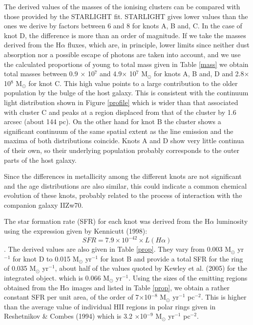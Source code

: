\documentclass[structabstract]{aa}
\begin{document}
The derived values of the masses of the ionising clusters can be compared with those provided by the
STARLIGHT fit. STARLIGHT gives lower values than the ones we derive by factors between 6 and 8 for knots A, B and, C. 
In the case of knot D, the difference is more than an order of magnitude. If we 
take the masses derived from the H$\alpha$ fluxes, which are, in principle, lower limits since neither dust absorption nor a possible escape of photons are taken into account, and we use the calculated proportions of young to total mass given in Table \ref{mass} we obtain total masses between 0.9 $\times$ 10$^7$ and 4.9$\times$ 10$^7$ M$_{\odot}$ for knots A, B and, D and 2.8$\times$10$^8$ M$_{\odot}$ for knot  C. This high value points to a large contribution to the older population by the bulge of the host galaxy. This is consistent with the continuum light distribution shown in Figure \ref{profile} which is wider than that associated with cluster C and peaks at a region displaced from that of the cluster by 1.6 arcsec (about 144 pc). On the other hand for knot B the cluster shows a significant continuum of the same spatial extent as the line emission and the maxima of both distributions coincide. Knots A and D show very little continua of their own, so their underlying population probably corresponds to the outer parts of the host galaxy.

Since the differences in metallicity among the different knots are not significant and the age distributions are also similar, this could indicate a common chemical evolution of these knots, probably related to the process of interaction with the companion galaxy IIZw70. 

The star formation rate (SFR) for each knot was derived from the H$\alpha$ luminosity using the expression given by Kennicutt (1998): 
\[ SFR = 7.9 \times 10^{-42} \times L(H\alpha) \].
The derived values are also given in Table \ref{prop}. They vary from 0.003 M$_\odot$ yr$^{-1}$ for  knot D to 0.015 M$_\odot$ yr$^{-1}$ for knot B and provide a total SFR for the ring of 0.035 M$_ \odot$ yr$^{-1}$, about half of the values quoted by  Kewley et al. (2005)  for the integrated object. which is  0.066 M$_{\odot}$ yr$^{-1}$. Using the sizes of the emitting regions obtained from the H$\alpha$ images and listed in Table \ref{prop}, we obtain a rather constant SFR per unit area, of the order of 7$\times$10$^{-8}$ M$_{\odot}$ yr$^{-1}$ pc$^{-2}$. This is higher than the average value of individual HII regions in polar rings given in Reshetnikov \& Combes (1994) which is 3.2 $\times$10$^{-9}$ M$_{\odot}$ yr$^{-1}$ pc$^{-2}$.
\end{document}
